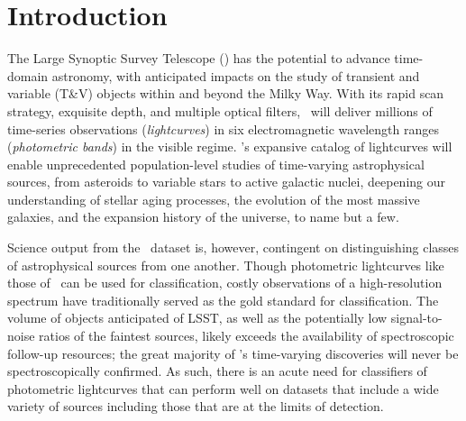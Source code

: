 \section{Introduction}
\label{sec:intro}

The Large Synoptic Survey Telescope (\lsst) has the potential to advance time-domain astronomy, with anticipated impacts on the study of transient and variable (T\&V) objects within and beyond the Milky Way.
With its rapid scan strategy, exquisite depth, and multiple optical filters, \lsst\ will deliver millions of time-series observations (\textit{lightcurves}) in six electromagnetic wavelength ranges (\textit{photometric bands}) in the visible regime.
\lsst's expansive catalog of lightcurves will enable unprecedented population-level studies of time-varying astrophysical sources, from asteroids to variable stars to active galactic nuclei, deepening our understanding of stellar aging processes, the evolution of the most massive galaxies, and the expansion history of the universe, to name but a few.

Science output from the \lsst\ dataset is, however, contingent on distinguishing classes of astrophysical sources from one another.
Though photometric lightcurves like those of \lsst\ can be used for classification, costly observations of a high-resolution spectrum have traditionally served as the gold standard for classification.
The volume of objects anticipated of LSST, as well as the potentially low signal-to-noise ratios of the faintest sources, likely exceeds the availability of spectroscopic follow-up resources; the great majority of \lsst's time-varying discoveries will never be spectroscopically confirmed.
As such, there is an acute need for classifiers of photometric lightcurves that can perform well on datasets that include a wide variety of sources including those that are at the limits of detection.

